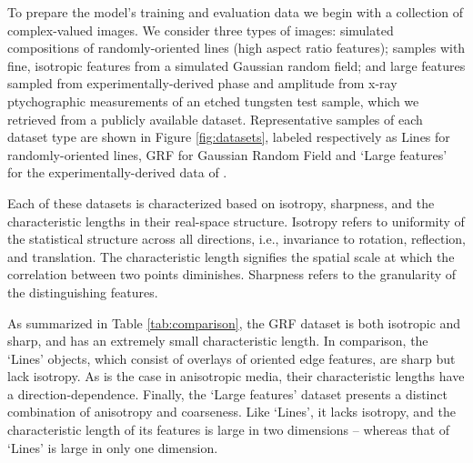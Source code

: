 \documentclass[sn-mathphys]{sn-jnl}%
\theoremstyle{thmstyleone}%
\theoremstyle{thmstyletwo}%
\theoremstyle{thmstylethree}%
\begin{document}
To prepare the model's training and evaluation data we begin with a collection of complex-valued images. We consider three types of images: simulated compositions of randomly-oriented lines (high aspect ratio features); samples with fine, isotropic features from a simulated Gaussian random field; and large features sampled from experimentally-derived phase and amplitude from x-ray ptychographic measurements of an etched tungsten test sample, which we retrieved from a publicly available dataset\cite{cherukara2020ai}. Representative samples of each dataset type are shown in Figure \ref{fig:datasets}, labeled respectively as Lines for randomly-oriented lines, GRF for Gaussian Random Field and `Large features' for the experimentally-derived data of \cite{cherukara2020ai}. 



 Each of these datasets is characterized based on isotropy, sharpness, and the characteristic lengths in their real-space structure. Isotropy refers to uniformity of the statistical structure across all directions, i.e., invariance to rotation, reflection, and translation. The characteristic length signifies the spatial scale at which the correlation between two points diminishes. Sharpness refers to the granularity of the distinguishing features.
 
 As summarized in Table \ref{tab:comparison}, the GRF dataset is both isotropic and sharp, and has an extremely small characteristic length. In comparison, the `Lines' objects, which consist of overlays of oriented edge features, are sharp but lack isotropy. As is the case in anisotropic media, their characteristic lengths have a direction-dependence. Finally, the `Large features' dataset presents a distinct combination of anisotropy and coarseness. Like `Lines', it lacks isotropy, and the characteristic length of its features is large in two dimensions -- whereas that of `Lines' is large in only one dimension.
\end{document}
